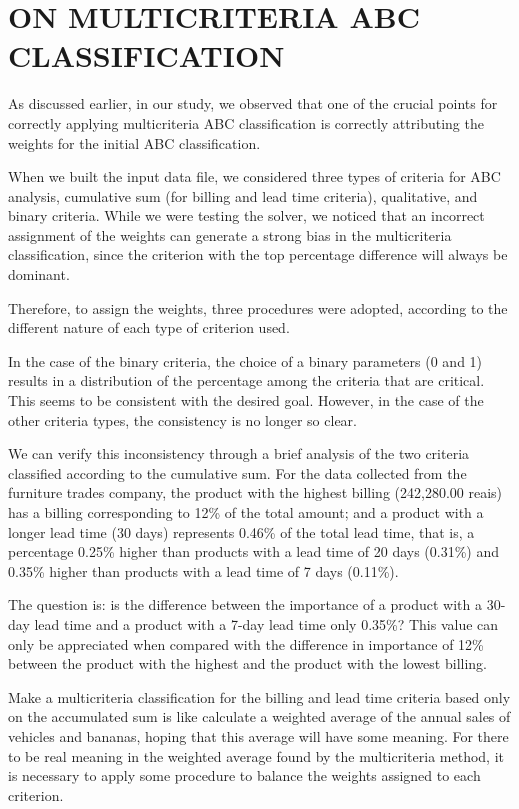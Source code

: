 \documentclass[10pt,fleqn,a4paper,twoside]{article}
\begin{document}
    \section{ON MULTICRITERIA ABC CLASSIFICATION}

As discussed earlier, in our study, we observed that one of the crucial points for correctly applying multicriteria ABC classification is correctly attributing the weights for the initial ABC classification.

When we built the input data file, we considered three types of criteria for ABC analysis, cumulative sum (for billing and lead time criteria), qualitative, and binary criteria. While we were testing the solver, we noticed that an incorrect assignment of the weights can generate a strong bias in the multicriteria classification, since the criterion with the top percentage difference will always be dominant.

Therefore, to assign the weights, three procedures were adopted, according to the different nature of each type of criterion used.

In the case of the binary criteria, the choice of a binary parameters (0 and 1) results in a distribution of the percentage among the criteria that are critical. This seems to be consistent with the desired goal. However, in the case of the other criteria types, the consistency is no longer so clear. 

We can verify this inconsistency through a brief analysis of the two criteria classified according to the cumulative sum. For the data collected from the furniture trades company, the product with the highest billing (242,280.00 reais) has a billing corresponding to 12\% of the total amount; and a product with a longer lead time (30 days) represents 0.46\% of the total lead time, that is, a percentage 0.25\% higher than products with a lead time of 20 days (0.31\%) and 0.35\% higher than products with a lead time of 7 days (0.11\%).  

The question is: is the difference between the importance of a product with a 30-day lead time and a product with a 7-day lead time only 0.35\%? This value can only be appreciated when compared with the difference in importance of 12\% between the product with the highest and the product with the lowest billing. 

Make a multicriteria classification for the billing and lead time criteria based only on the accumulated sum is like calculate a weighted average of the annual sales of vehicles and bananas, hoping that this average will have some meaning. For there to be real meaning in the weighted average found by the multicriteria method, it is necessary to apply some procedure to balance the weights assigned to each criterion.
	
\end{document}
